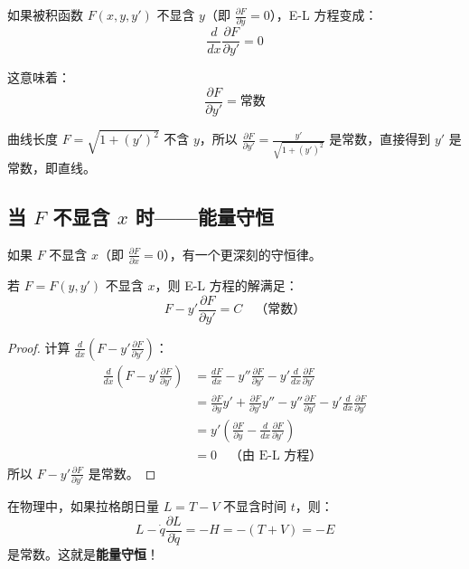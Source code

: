 如果被积函数 $F(x, y, y')$ 不显含 $y$（即 $\frac{\partial F}{\partial y} = 0$），E-L 方程变成：
\[
\frac{d}{dx}\frac{\partial F}{\partial y'} = 0
\]

这意味着：
\begin{equation}
\boxed{\frac{\partial F}{\partial y'} = \text{常数}}
\end{equation}

\begin{example}[测地线]
曲线长度 $F = \sqrt{1 + (y')^2}$ 不含 $y$，所以 $\frac{\partial F}{\partial y'} = \frac{y'}{\sqrt{1+(y')^2}}$ 是常数，直接得到 $y'$ 是常数，即直线。
\end{example}

\subsection{当 $F$ 不显含 $x$ 时——能量守恒}

如果 $F$ 不显含 $x$（即 $\frac{\partial F}{\partial x} = 0$），有一个更深刻的守恒律。

\begin{keytheorem}[title=Beltrami 恒等式]
若 $F = F(y, y')$ 不显含 $x$，则 E-L 方程的解满足：
\begin{equation}
\boxed{F - y' \frac{\partial F}{\partial y'} = C \quad \text{（常数）}}
\end{equation}
\end{keytheorem}

\begin{proof}
计算 $\frac{d}{dx}\left(F - y' \frac{\partial F}{\partial y'}\right)$：
\begin{align}
\frac{d}{dx}\left(F - y' \frac{\partial F}{\partial y'}\right) 
&= \frac{dF}{dx} - y'' \frac{\partial F}{\partial y'} - y' \frac{d}{dx}\frac{\partial F}{\partial y'} \\
&= \frac{\partial F}{\partial y} y' + \frac{\partial F}{\partial y'} y'' - y'' \frac{\partial F}{\partial y'} - y' \frac{d}{dx}\frac{\partial F}{\partial y'} \\
&= y' \left( \frac{\partial F}{\partial y} - \frac{d}{dx}\frac{\partial F}{\partial y'} \right) \\
&= 0 \quad \text{（由 E-L 方程）}
\end{align}
所以 $F - y' \frac{\partial F}{\partial y'}$ 是常数。
\end{proof}

\begin{physicalmeaning}
在物理中，如果拉格朗日量 $L = T - V$ 不显含时间 $t$，则：
\[
L - \dot{q} \frac{\partial L}{\partial \dot{q}} = -H = -(T + V) = -E
\]
是常数。这就是\textbf{能量守恒}！
\end{physicalmeaning}

